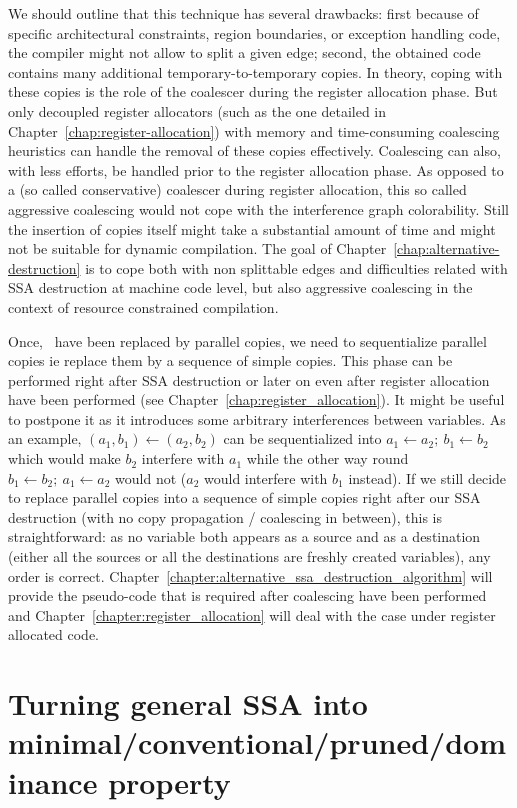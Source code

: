 We should outline that this technique has several drawbacks: first because of specific architectural constraints, region boundaries, or exception handling code, the compiler might not allow to split a given edge; second, the obtained code contains many additional temporary-to-temporary copies. In theory, coping with these copies is the role of the coalescer during the register allocation phase. But only decoupled register allocators (such as the one detailed in Chapter~\ref{chap:register-allocation}) with memory and time-consuming coalescing heuristics can handle the removal of these copies effectively. Coalescing can also, with less efforts, be handled prior to the register allocation phase. As opposed to a (so called conservative) coalescer during register allocation, this so called aggressive coalescing would not cope with the interference graph colorability. Still the insertion of copies itself might take a substantial amount of time and might not be suitable for dynamic compilation. The goal of Chapter~\ref{chap:alternative-destruction} is to cope both with non splittable edges and difficulties related with SSA destruction at machine code level, but also aggressive coalescing in the context of resource constrained compilation.

Once, \phiops\ have been replaced by parallel copies, we need to sequentialize parallel copies ie replace them by a sequence of simple copies. This phase can be performed right after SSA destruction or later on even after register allocation have been performed (see Chapter~\ref{chap:register_allocation}). It might be useful to postpone it as it introduces some arbitrary interferences between variables. As an example, $(a_1,b_1)\gets (a_2,b_2)$ can be sequentialized into $a_1\gets a_2;\ b_1\gets b_2$ which would make $b_2$ interfere with $a_1$ while the other way round $b_1\gets b_2;\ a_1\gets a_2$ would not ($a_2$ would interfere with $b_1$ instead).
If we still decide to replace parallel copies into a sequence of simple copies right after our SSA destruction (with no copy propagation / coalescing in between), this is straightforward: as no variable both appears as a source and as a destination (either all the sources or all the destinations are freshly created variables), any order is correct. Chapter~\ref{chapter:alternative_ssa_destruction_algorithm} will provide the pseudo-code that is required after coalescing have been performed and Chapter~\ref{chapter:register_allocation} will deal with the case under register allocated code.

\section{Turning general SSA into minimal/conventional/pruned/dominance property}

